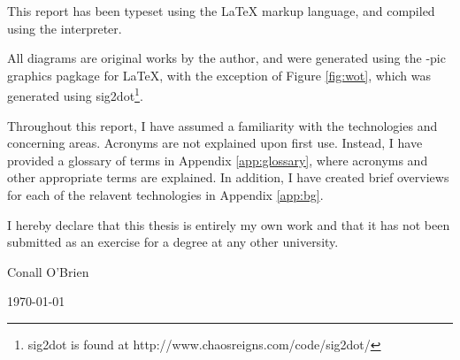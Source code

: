 
This report has been typeset using the \textrm{\LaTeX{}} markup language, 
and compiled using the \textrm{\LaTeXe{}} interpreter. 


All diagrams are original works by the author, and were generated 
using the \textrm{\Xy-pic{}} graphics pagkage for \textrm{\LaTeX{}},
with the exception of Figure \ref{fig:wot}, which was generated using
sig2dot\footnote{sig2dot is found at http://www.chaosreigns.com/code/sig2dot/}.



Throughout this report, I have assumed a familiarity with the
technologies and concerning areas. Acronyms are not explained upon first
use. Instead, I have provided a glossary of terms in Appendix
\ref{app:glossary}, where acronyms and other appropriate terms are
explained. In addition, I have created brief overviews for each 
of the relavent technologies in Appendix \ref{app:bg}.



\vfill


I hereby declare that this thesis is entirely my own work and that it
has not been submitted as an exercise for a degree at any other
university.

\vspace{35mm}

\begin{flushright}

\underline{\hspace*{75mm}}

Conall O'Brien

\today

\end{flushright}
